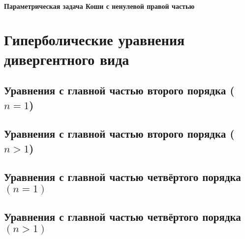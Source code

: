 \documentclass{report}
\begin{document}
	    
	    \subsection{Параметрическая задача Коши с ненулевой правой частью}




\part{Гиперболические уравнения дивергентного вида}

    \chapter{Уравнения с главной частью второго порядка ($n=1$)}

    \chapter{Уравнения с главной частью второго порядка ($n>1$)}

    \chapter{Уравнения с главной частью четвёртого порядка $(n=1)$}

    \chapter{Уравнения с главной частью четвёртого порядка $(n>1)$}
\end{document}
